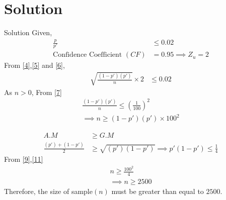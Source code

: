 \documentclass{beamer}
\begin{document}
\section{Solution}
\begin{frame}{Solution}
    Given,\\
    \begin{align}
        \frac{p}{p'} &\leq 0.02 \label{5}\\
       \text{Confidence Coefficient } (CF) &= 0.95
        \implies Z_u = 2 \label{6}
    \end{align}
From \eqref{4},\eqref{5} and \eqref{6},
    \begin{align}
        \sqrt{\frac{(1-p')(p')}{n}} \times 2 & \leq 0.02 \label{7}
    \end{align}
As $n >0 $, From \eqref{7}
    \begin{align}
        \frac{(1-p')(p')}{n} \leq \left(\frac{1}{100}\right)^2\\
        \implies n \geq {(1-p')(p')} \times 100^2 \label{9}
    \end{align}

\end{frame}
\begin{frame}{}
\begin{align}
    A.M &\geq G.M\\
    \frac{(p')+(1-p')}{2} &\geq \sqrt{(p')(1-p')}
    \implies p'(1-p') \leq \frac{1}{4} \label{11}
\end{align}
    From \eqref{9},\eqref{11}
    \begin{align}
        n \geq \frac{100^2}{4}\\
        \implies n \geq 2500
    \end{align}
Therefore,
the size of sample$(n)$ must be greater than equal to $2500$.
\end{frame}
\end{document}
